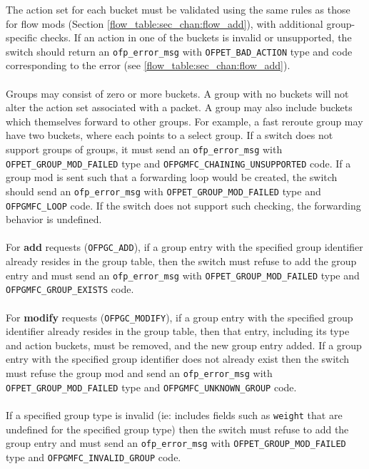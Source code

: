 \documentclass[10pt]{article}
\begin{document}
The action set for each bucket must be validated using the same rules as those for flow mods (Section \ref{flow_table:sec_chan:flow_add}), with additional group-specific checks. If an action in one of the buckets is invalid or unsupported, the switch should return an \verb|ofp_error_msg| with \verb|OFPET_BAD_ACTION| type and code corresponding to the error (see \ref{flow_table:sec_chan:flow_add}).
\\\\
Groups may consist of zero or more buckets. A group with no buckets will not alter the action set associated with a packet. A group may also include buckets which themselves forward to other groups. For example, a fast reroute group may have two buckets, where each points to a select group. If a switch does not support groups of groups, it must send an \verb|ofp_error_msg| with \verb|OFPET_GROUP_MOD_FAILED| type and \verb|OFPGMFC_CHAINING_UNSUPPORTED| code.  If a group mod is sent such that a forwarding loop would be created, the switch should send an \verb|ofp_error_msg| with \verb|OFPET_GROUP_MOD_FAILED| type and \verb|OFPGMFC_LOOP| code.  If the switch does not support such checking, the forwarding behavior is undefined.
\\\\
For \textbf{add} requests (\verb|OFPGC_ADD|), if a group entry with the specified group identifier already resides in the group table, then the switch must refuse to add the group entry and must send an \verb|ofp_error_msg| with \verb|OFPET_GROUP_MOD_FAILED| type and \verb|OFPGMFC_GROUP_EXISTS| code.
\\\\
For \textbf{modify} requests (\verb|OFPGC_MODIFY|), if a group entry with the specified group identifier already resides in the group table, then that entry, including its type and action buckets, must be removed, and the new group entry added. If a group entry with the specified group identifier does not already exist then the switch must refuse the group mod and send an \verb|ofp_error_msg| with \verb|OFPET_GROUP_MOD_FAILED| type and \verb|OFPGMFC_UNKNOWN_GROUP| code.
\\\\
If a specified group type is invalid (ie: includes fields such as \verb|weight| that are undefined for the specified group type) then the switch must refuse to add the group entry and must send an \verb|ofp_error_msg| with \verb|OFPET_GROUP_MOD_FAILED| type and \verb|OFPGMFC_INVALID_GROUP| code.
\\\\
\end{document}
